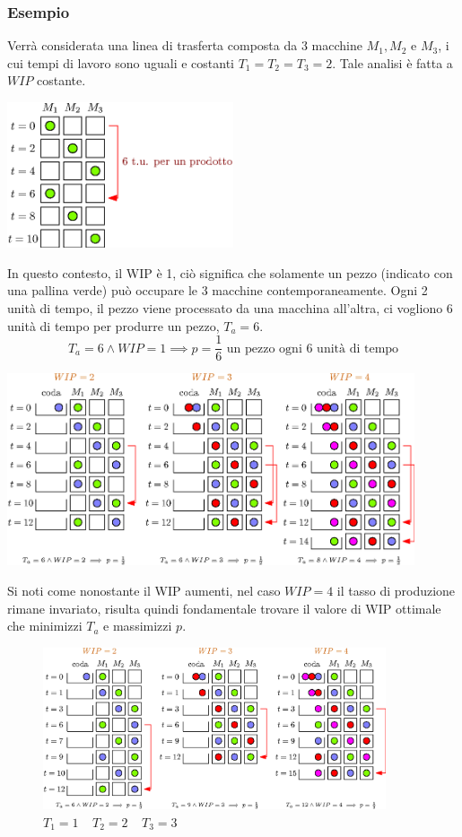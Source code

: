 \documentclass[10pt, letterpaper]{report}
\begin{document}
\subsubsection{Esempio}
Verrà considerata una linea di trasferta composta da 3 macchine $M_1,M_2$ e $M_3$, i cui tempi di 
lavoro sono uguali e costanti $T_1=T_2=T_3=2$. Tale analisi è fatta a $WIP$ costante.
\begin{center}
    \includegraphics[width=0.5\textwidth ]{images/WIP1.eps}
\end{center}
In questo contesto, il WIP è 1, ciò significa che solamente un pezzo (indicato con una pallina verde) può 
occupare le 3 macchine contemporaneamente. Ogni 2 unità di tempo, il pezzo viene processato da una 
macchina all'altra, ci vogliono 6 unità di tempo per produrre un pezzo, $T_a=6$. 
$$T_a=6 \land WIP = 1 \implies p = \frac{1}{6} \text{ un pezzo ogni 6 unità di tempo}$$
\begin{center}
    \includegraphics[width=0.9\textwidth ]{images/WIP2.eps}
\end{center}
Si noti come nonostante il WIP aumenti, nel caso $WIP=4$ il tasso di produzione rimane invariato, 
risulta quindi fondamentale trovare il valore di WIP ottimale che minimizzi $T_a$ e 
massimizzi $p$. 
\begin{center}
    \begin{figure}[h!]
        \centering
        \includegraphics[width=0.9\textwidth ]{images/WIP3.eps}
        \caption{$ T_1 = 1\ \ \ \ \ T_2 = 2 \ \ \ \ \ T_3 = 3$}
        \label{fig:wip3}
    \end{figure}
\end{center}
\end{document}
